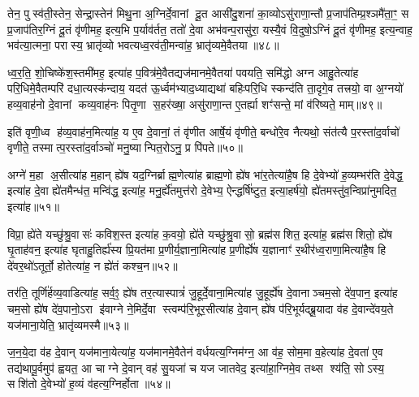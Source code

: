तेन॒ पुस्व॑ती॒स्तेन॒ सेन्द्रा॒स्तेन॑ मिथु॒ना अ॒ग्निर्दे॒वानां दू॒त आसी॑दु॒शना॑ का॒व्योऽसु॑राणा॒न्तौ प्र॒जाप॑तिम्प्र॒श्ञमै॑ता॒ꣳ॒ स प्र॒जाप॑तिर॒ग्निं दू॒तं वृ॑णीमह॒ इत्य॒भि प॒र्याव॑र्तत॒ ततो॑ दे॒वा अभ॑वन्प॒रासु॑रा॒ यस्यै॒वं वि॒दुषो॒ऽग्निं दू॒तं वृ॑णीमह॒ इत्य॒न्वाह॒ भव॑त्या॒त्मना॒ परास्य॒ भ्रातृ॑व्यो भवत्यध्व॒रव॑ती॒मन्वा॑ह॒ भ्रातृ॑व्यमे॒वैतया॥४८॥

ध्व॒र॒ति॒ शो॒चिष्के॑श॒स्तमी॑मह॒ इत्या॑ह प॒वित्र॑मे॒वैतद्यज॑मानमे॒वैतया॑ पवयति॒ समि॑द्धो अग्न आहु॒तेत्या॑ह परि॒धिमे॒वैतम्परि॑ दधा॒त्यस्क॑न्दाय॒ यदत॑ ऊ॒र्ध्वम॑भ्याद॒ध्याद्यथा॑ बहिःपरि॒धि स्कन्द॑ति ता॒दृगे॒व तत्त्रयो॒ वा अ॒ग्नयो॑ हव्य॒वाह॑नो दे॒वानां कव्य॒वाह॑नः पितृ॒णा स॒हर॑ख्षा॒ असु॑राणा॒न्त ए॒तर्\mbox{}ह्या शꣳ॑सन्ते॒ मां व॑रिष्यते॒ माम्॥४९॥

इति॑ वृणी॒ध्व ह॑व्य॒वाह॑न॒मित्या॑ह॒ य ए॒व दे॒वानां॒ तं वृ॑णीत आर्\mbox{}षे॒यं वृ॑णीते॒ बन्धो॑रे॒व नैत्यथो॒ संत॑त्यै प॒रस्ता॑द॒र्वाचो॑ वृणीते॒ तस्मात्प॒रस्ता॑द॒र्वाञ्चो॑ मनु॒ष्यान्पित॒रोऽनु॒ प्र पि॑पते॥५०॥

{\anuvakamend[{अशान्तावाह॒ पञ्च॑दशाब्रवी॒दन्वा॑है॒तया॑ वरिष्यते॒ मामेका॒न्नत्रि॒ꣳ॒शच्च॑॥८॥}]}

अग्ने॑ म॒हा अ॒सीत्या॑ह म॒हान् ह्ये॑ष यद॒ग्निर्ब्राह्म॒णेत्या॑ह ब्राह्म॒णो ह्ये॑ष भा॑र॒तेत्या॑है॒ष हि दे॒वेभ्यो॑ ह॒व्यम्भर॑ति दे॒वेद्ध॒ इत्या॑ह दे॒वा ह्ये॑तमैन्ध॑त॒ मन्वि॑द्ध॒ इत्या॑ह॒ मनु॒र्\mbox{}ह्ये॑तमुत्त॑रो दे॒वेभ्य॒ ऐन्द्धर्\mbox{}षि॑ष्टुत॒ इत्या॒हर्\mbox{}ष॑यो॒ ह्ये॑तमस्तु॑व॒न्विप्रा॑नुमदित॒ इत्या॑ह॥५१॥

विप्रा॒ ह्ये॑ते यच्छु॑श्रु॒वासः॑ कविश॒स्त इत्या॑ह क॒वयो॒ ह्ये॑ते यच्छु॑श्रु॒वासो॒ ब्रह्म॑सशित॒ इत्या॑ह॒ ब्रह्म॑सशितो॒ ह्ये॑ष घृ॒ताह॑वन॒ इत्या॑ह घृताहु॒तिर्\mbox{}ह्य॑स्य प्रि॒यत॑मा प्र॒णीर्य॒ज्ञाना॒मित्या॑ह प्र॒णीर्\mbox{}ह्ये॑ष य॒ज्ञानाꣳ॑ र॒थीर॑ध्व॒राणा॒मित्या॑है॒ष हि दे॑वर॒थो॑ऽतूर्तो॒ होतेत्या॑ह॒ न ह्ये॑तं कश्च॒न॥५२॥

तर॑ति॒ तूर्णि॑र्\mbox{}हव्य॒वाडित्या॑ह॒ सर्व॒ꣵ॒ ह्ये॑ष तर॒त्यास्पात्रं॑ जु॒हूर्दे॒वाना॒मित्या॑ह जु॒हूर्\mbox{}ह्ये॑ष दे॒वानाञ्चम॒सो दे॑व॒पान॒ इत्या॑ह चम॒सो ह्ये॑ष दे॑व॒पानो॒ऽरा इ॑वाग्ने ने॒मिर्दे॒वा स्त्वम्प॑रि॒भूर॒सीत्या॑ह दे॒वान् ह्ये॑ष प॑रि॒भूर्यद्ब्रू॒यादा व॑ह दे॒वान्दे॑वय॒ते यज॑माना॒येति॒ भ्रातृ॑व्यमस्मै॥५३॥

ज॒न॒ये॒दा व॑ह दे॒वान् यज॑माना॒येत्या॑ह॒ यज॑मानमे॒वैतेन॑ वर्धयत्य॒ग्निम॑ग्न॒ आ व॑ह॒ सोम॒मा व॒हेत्या॑ह दे॒वता॑ ए॒व तद्य॑थापू॒र्वमुप॑ ह्वयत॒ आ चाग्ने दे॒वान् वह॑ सु॒यजा॑ च यज जातवेद॒ इत्या॑हा॒ग्निमे॒व तथ्स श्य॑ति॒ सोऽस्य॒ सशि॑तो दे॒वेभ्यो॑ ह॒व्यं व॑हत्य॒ग्निर्\mbox{}होता॥५४॥

